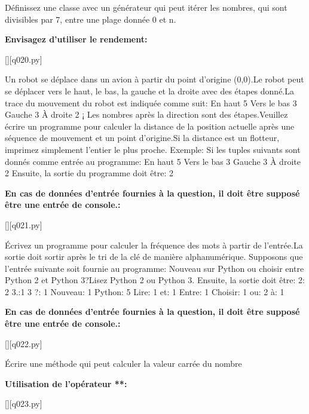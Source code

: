 \question
Définissez une classe avec un générateur qui peut itérer les nombres, qui sont divisibles par 7, entre une plage donnée 0 et n.
\par
\textbf{Envisagez d'utiliser le rendement:}
\renewcommand{\nomfichier}{q020.py}
\begin{solution}
    \pythonfile{\chemincode \nomfichier}[][q020.py]
\end{solution}


\question
Un robot se déplace dans un avion à partir du point d'origine (0,0).Le robot peut se déplacer vers le haut, le bas, la gauche et la droite avec des étapes donné.La trace du mouvement du robot est indiquée comme suit:
En haut 5
Vers le bas 3
Gauche 3
À droite 2
¡
Les nombres après la direction sont des étapes.Veuillez écrire un programme pour calculer la distance de la position actuelle après une séquence de mouvement et un point d'origine.Si la distance est un flotteur, imprimez simplement l'entier le plus proche.
Exemple:
Si les tuples suivants sont donnés comme entrée au programme:
En haut 5
Vers le bas 3
Gauche 3
À droite 2
Ensuite, la sortie du programme doit être:
2
\par
\textbf{En cas de données d'entrée fournies à la question, il doit être supposé être une entrée de console.:}
\renewcommand{\nomfichier}{q021.py}
\begin{solution}
    \pythonfile{\chemincode \nomfichier}[][q021.py]
\end{solution}


\question
Écrivez un programme pour calculer la fréquence des mots à partir de l'entrée.La sortie doit sortir après le tri de la clé de manière alphanumérique.
Supposons que l'entrée suivante soit fournie au programme:
Nouveau sur Python ou choisir entre Python 2 et Python 3?Lisez Python 2 ou Python 3.
Ensuite, la sortie doit être:
2: 2
3.:1
3 ?: 1
Nouveau: 1
Python: 5
Lire: 1
et: 1
Entre: 1
Choisir: 1
ou: 2
à: 1
\par
\textbf{En cas de données d'entrée fournies à la question, il doit être supposé être une entrée de console.:}
\renewcommand{\nomfichier}{q022.py}
\begin{solution}
    \pythonfile{\chemincode \nomfichier}[][q022.py]
\end{solution}


\question
Écrire une méthode qui peut calculer la valeur carrée du nombre
\par
\textbf{Utilisation de l'opérateur **:}
\renewcommand{\nomfichier}{q023.py}
\begin{solution}
    \pythonfile{\chemincode \nomfichier}[][q023.py]
\end{solution}


